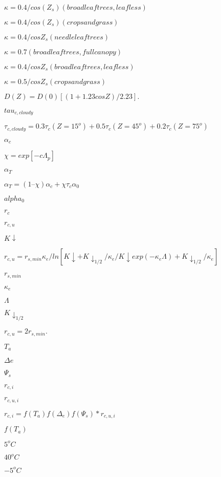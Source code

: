 \documentclass{article}
\begin{document}
$\kappa = 0.4/cos(Z_s) (broadleaf trees, leafless)$
\pagebreak

$\kappa = 0.4/cos(Z_s) (crops and grass)$
\pagebreak

$\kappa = 0.4/cosZ_s (needleleaf trees)$
\pagebreak

$\kappa = 0.7 (broadleaf trees, full canopy)$
\pagebreak

$\kappa = 0.4/cosZ_s (broadleaf trees, leafless)$
\pagebreak

$\kappa = 0.5/cosZ_s (crops and grass)$
\pagebreak

$D(Z) = D(0) [(1 + 1.23cosZ)/2.23].$
\pagebreak

$tau_{c,cloudy}$
\pagebreak

$\tau_{c,cloudy} = 0.3 \tau_c(Z=15^o) + 0.5 \tau_c(Z=45^o) + 0.2 \tau_c(Z=75^o)$
\pagebreak

$\alpha_c$
\pagebreak

$\chi = exp[-c\Lambda_p]$
\pagebreak

$\alpha_T$
\pagebreak

$\alpha_T = (1 – \chi) \alpha_c + \chi \tau_c \alpha_0$
\pagebreak

$alpha_0$
\pagebreak

$r_c$
\pagebreak

$r_{c,u}$
\pagebreak

$K\downarrow$
\pagebreak

$r_{c,u} = r_{s,min} \kappa_e / ln[{K\downarrow + K\downarrow_{1/2} / \kappa_e} / { K\downarrow exp(-\kappa_e \Lambda ) + K\downarrow_{1/2} / \kappa_e }]$
\pagebreak

$r_{s,min}$
\pagebreak

$\kappa_e$
\pagebreak

$\Lambda$
\pagebreak

$K\downarrow_{1/2}$
\pagebreak

$r_{c,u} = 2 r_{s,min}.$
\pagebreak

$T_a$
\pagebreak

$\Delta e$
\pagebreak

$\Psi_s$
\pagebreak

$r_{c,i}$
\pagebreak

$r_{c,u,i}$
\pagebreak

$r_{c,i} = f(T_a) f( \Delta_e ) f( \Psi_s ) * r_{c,u,i}$
\pagebreak

$f(T_a)$
\pagebreak

$5^o C$
\pagebreak

$40^o C$
\pagebreak

$-5^o C$
\pagebreak
\end{document}
